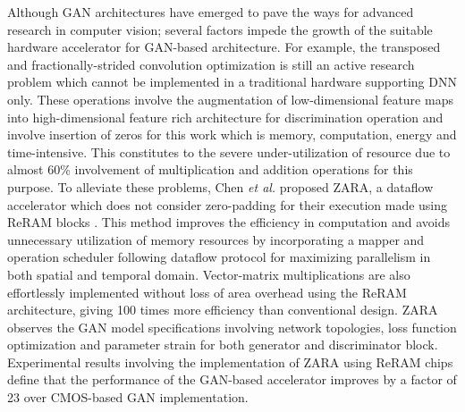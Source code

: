\documentclass[journal]{IEEEtran}
\begin{document}


\par Although GAN architectures have emerged to pave the ways for advanced research in computer vision; several factors impede the growth of the suitable hardware accelerator for GAN-based architecture. For example, the transposed and fractionally-strided convolution optimization is still an active research problem which cannot be implemented in a traditional hardware supporting DNN only. These operations involve the augmentation of low-dimensional feature maps into high-dimensional feature rich architecture for discrimination operation and involve insertion of zeros for this work which is memory, computation, energy and time-intensive. This constitutes to the severe under-utilization of resource due to almost 60\% involvement of multiplication and addition operations for this purpose. To alleviate these problems, Chen \textit{et al.} proposed ZARA, a dataflow accelerator which does not consider zero-padding for their execution made using ReRAM blocks \cite{paper39}. This method improves the efficiency in computation and avoids unnecessary utilization of memory resources by incorporating a mapper and operation scheduler following dataflow protocol for maximizing parallelism in both spatial and temporal domain. Vector-matrix multiplications are also effortlessly implemented without loss of area overhead using the ReRAM architecture, giving 100 times more efficiency than conventional design. ZARA observes the GAN model specifications involving network topologies, loss function optimization and parameter strain for both generator and discriminator block. Experimental results involving the implementation of ZARA using ReRAM chips define that the performance of the GAN-based accelerator improves by a factor of 23 over CMOS-based GAN implementation.  
\end{document}
